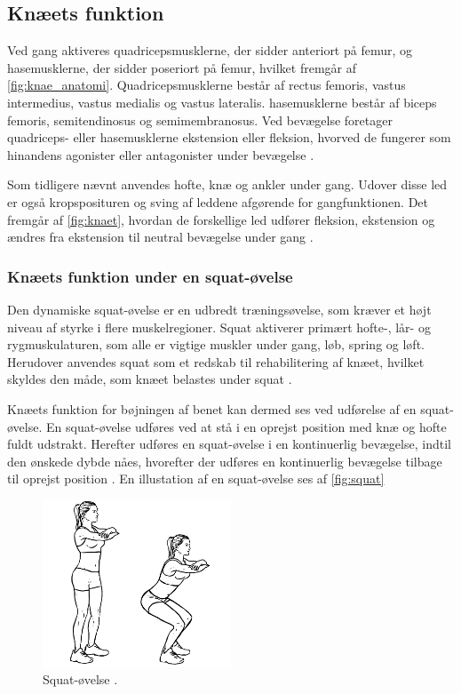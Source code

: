 \subsection{Knæets funktion}
Ved gang aktiveres quadricepsmusklerne, der sidder anteriort på femur, og hasemusklerne, der sidder poseriort på femur, hvilket fremgår af \autoref{fig:knae_anatomi}. Quadricepsmusklerne består af rectus femoris, vastus intermedius, vastus medialis og vastus lateralis. hasemusklerne består af biceps femoris, semitendinosus og semimembranosus. Ved bevægelse foretager quadriceps- eller hasemusklerne ekstension eller fleksion, hvorved de fungerer som hinandens agonister eller antagonister under bevægelse \citep{martini2012}. 

Som tidligere nævnt anvendes hofte, knæ og ankler under gang. Udover disse led er også kropsposituren og sving af leddene afgørende for gangfunktionen. Det fremgår af \autoref{fig:knaet}, hvordan de forskellige led udfører fleksion, ekstension og ændres fra ekstension til neutral bevægelse under gang \citep{martini2012}.

\subsubsection{Knæets funktion under en squat-øvelse} \label{sec:knaeled_squat}
Den dynamiske squat-øvelse er en udbredt træningsøvelse, som kræver et højt niveau af styrke i flere muskelregioner. Squat aktiverer primært hofte-, lår- og rygmuskulaturen, som alle er vigtige muskler under gang, løb, spring og løft. Herudover anvendes squat som et redskab til rehabilitering af knæet, hvilket skyldes den måde, som knæet belastes under squat \citep{escamilla2001}. 

Knæets funktion for bøjningen af benet kan dermed ses ved udførelse af en squat-øvelse. En squat-øvelse udføres ved at stå i en oprejst position med knæ og hofte fuldt udstrakt. Herefter udføres en squat-øvelse i en kontinuerlig bevægelse, indtil den ønskede dybde nåes, hvorefter der udføres en kontinuerlig bevægelse tilbage til oprejst position \citep{escamilla2001}. En illustation af en squat-øvelse ses af \autoref{fig:squat}

\begin{figure}[H]
\centering
\includegraphics[width=0.5\textwidth]{figures/squat.png}
\caption{Squat-øvelse \citep{squat2015}.}
\label{fig:squat}
\end{figure}

